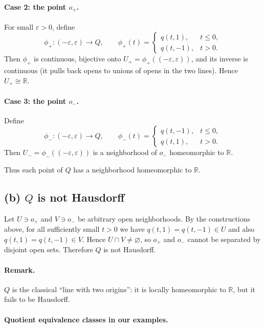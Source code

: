 \documentclass[12pt,a4paper]{article}
\theoremstyle{plain}
\theoremstyle{definition}
\theoremstyle{remark}
\theoremstyle{remark}
\begin{document}
	\paragraph{Case 2: the point $o_+$.}
	For small $\varepsilon>0$, define
	\[
	\phi_+:(-\varepsilon,\varepsilon)\longrightarrow Q,\qquad
	\phi_+(t)=
	\begin{cases}
		q(t,1), & t\le 0,\\[2pt]
		q(t,-1), & t>0.
	\end{cases}
	\]
	Then $\phi_+$ is continuous, bijective onto $U_+=\phi_+((-\varepsilon,\varepsilon))$, and its inverse is continuous (it pulls back opens to unions of opens in the two lines). Hence $U_+\cong\mathbb{R}$.
	
	\paragraph{Case 3: the point $o_-$.}
	Define
	\[
	\phi_-:(-\varepsilon,\varepsilon)\to Q,\qquad
	\phi_-(t)=
	\begin{cases}
		q(t,-1), & t\le 0,\\[2pt]
		q(t,1),  & t>0.
	\end{cases}
	\]
	Then $U_-=\phi_-((-\varepsilon,\varepsilon))$ is a neighborhood of $o_-$ homeomorphic to $\mathbb{R}$.
	
	Thus each point of $Q$ has a neighborhood homeomorphic to $\mathbb{R}$.
	
	\subsection*{(b) $Q$ is not Hausdorff}
	Let $U\ni o_+$ and $V\ni o_-$ be arbitrary open neighborhoods. By the constructions above,
	for all sufficiently small $t>0$ we have $q(t,1)=q(t,-1)\in U$ and also $q(t,1)=q(t,-1)\in V$.
	Hence $U\cap V\neq\varnothing$, so $o_+$ and $o_-$ cannot be separated by disjoint open sets.
	Therefore $Q$ is not Hausdorff.
	
	\paragraph{Remark.}
	$Q$ is the classical ``line with two origins'': it is locally homeomorphic to $\mathbb{R}$, but it fails to be Hausdorff.
	
	\paragraph{Quotient equivalence classes in our examples.}
	
\end{document}
